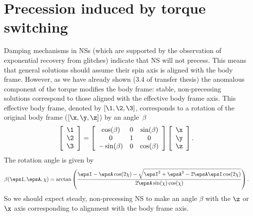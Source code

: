 \documentclass[/home/greg/Thesis/main/main.tex]{subfiles}
\begin{document}
\graphicspath{{/home/greg/Neutron_star_modelling/TwoStateSwitching/PrecessionInducedBySwitching/img/}}

\section{Precession induced by torque switching}

Damping mechanisms in NSs (which are supported by the observation of exponential
recovery from glitches) indicate that NS will not precess. This means that general
solutions should assume their spin axis is aligned with the body frame. However, 
as we have already shown (3.4 of transfer thesis) the anomalous component of the
\citet{Deutsch1955} torque modifies the body frame: stable, non-precessing solutions
correspond to those aligned with the effective body frame axis. This effective
body frame, denoted by $[\1, \2, \3]$, corresponds to a rotation of the original
body frame ($[\x, \y, \z]$) by an angle~$\beta$
\begin{align}
    \left[\begin{array}{c} \1 \\ \2 \\ \3 \end{array} \right] = 
    \left[\begin{array}{ccc} 
            \cos(\beta) & 0 & \sin(\beta)  \\
            0 & 1 & 0  \\
            -\sin(\beta) & 0 & \cos(\beta)  
    \end{array} \right]
    \left[\begin{array}{c} \x \\ \y \\ \z \end{array} \right].
\end{align}
The rotation angle is given by 
\begin{equation}
    \beta(\epsI, \epsA, \chi) = \arctan\left(
    \frac{\epsI - \epsA \cos(2\chi) - \sqrt{\epsI^{2} + \epsA^{2} -2\epsA\epsI\cos(2\chi)}}
    {2\epsA\sin(\chi)\cos(\chi)}
    \right).
\end{equation}
So we should expect steady, non-precessing NS to make an angle $\beta$ with 
the $\z$ or $\x$ axis corresponding to alignment with the body frame axis.
\end{document}
